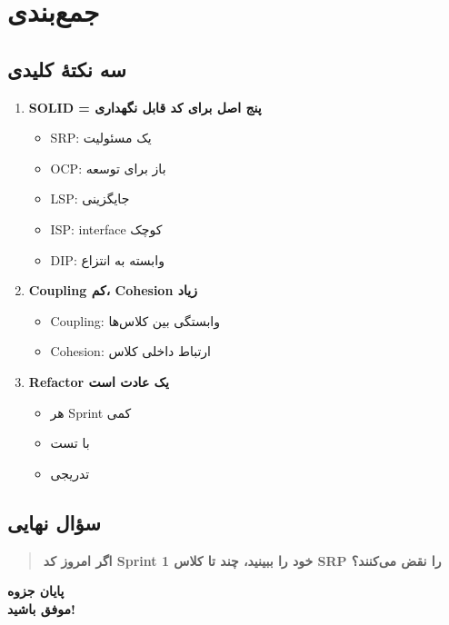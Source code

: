 \documentclass[12pt, a4paper]{article}
\begin{document}
\section{جمع‌بندی}

\subsection{سه نکتهٔ کلیدی}
\begin{enumerate}
    \item \textbf{SOLID = پنج اصل برای کد قابل نگهداری}
    \begin{itemize}
        \item SRP: یک مسئولیت
        \item OCP: باز برای توسعه
        \item LSP: جایگزینی
        \item ISP: interface کوچک
        \item DIP: وابسته به انتزاع
    \end{itemize}
    \item \textbf{Coupling کم، Cohesion زیاد}
    \begin{itemize}
        \item Coupling: وابستگی بین کلاس‌ها
        \item Cohesion: ارتباط داخلی کلاس
    \end{itemize}
    \item \textbf{Refactor یک عادت است}
    \begin{itemize}
        \item هر Sprint کمی
        \item با تست
        \item تدریجی
    \end{itemize}
\end{enumerate}

\subsection{سؤال نهایی}
\begin{quote}
\textbf{اگر امروز کد Sprint 1 خود را ببینید، چند تا کلاس SRP را نقض 
می‌کنند؟}
\end{quote}

\vspace{1cm}

\begin{center}
\textbf{\Large پایان جزوه}\\[0.5cm]
\textbf{\Large موفق باشید!}
\end{center}
\end{document}
